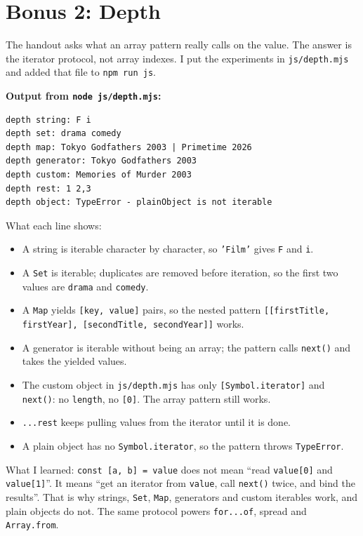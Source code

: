\documentclass[
  11pt,
]{article}
\providecommand{\tightlist}{%
  \setlength{\itemsep}{0pt}\setlength{\parskip}{0pt}}
\begin{document}
\section{Bonus 2: Depth}\label{bonus-2-depth}

The handout asks what an array pattern really calls on the value. The
answer is the iterator protocol, not array indexes. I put the
experiments in \texttt{js/depth.mjs} and added that
file to \texttt{npm run js}.

\textbf{Output from \texttt{node js/depth.mjs}:}

\begin{lstlisting}
depth string: F i
depth set: drama comedy
depth map: Tokyo Godfathers 2003 | Primetime 2026
depth generator: Tokyo Godfathers 2003
depth custom: Memories of Murder 2003
depth rest: 1 2,3
depth object: TypeError - plainObject is not iterable
\end{lstlisting}

What each line shows:

\begin{itemize}
\tightlist
\item
  A string is iterable character by character, so
  \texttt{'Film'} gives \texttt{F} and
  \texttt{i}.
\item
  A \texttt{Set} is iterable; duplicates are removed
  before iteration, so the first two values are
  \texttt{drama} and \texttt{comedy}.
\item
  A \texttt{Map} yields
  \texttt{[key, value]} pairs, so the nested pattern
  \texttt{[[firstTitle, firstYear], [secondTitle, secondYear]]}
  works.
\item
  A generator is iterable without being an array; the pattern calls
  \texttt{next()} and takes the yielded values.
\item
  The custom object in \texttt{js/depth.mjs} has only
  \texttt{[Symbol.iterator]} and
  \texttt{next()}: no \texttt{length},
  no \texttt{[0]}. The array pattern still works.
\item
  \texttt{...rest} keeps pulling values from the
  iterator until it is done.
\item
  A plain object has no \texttt{Symbol.iterator}, so
  the pattern throws \texttt{TypeError}.
\end{itemize}

What I learned: \texttt{const [a, b] = value} does not
mean ``read \texttt{value[0]} and
\texttt{value[1]}''. It means ``get an iterator from
\texttt{value}, call \texttt{next()}
twice, and bind the results''. That is why strings,
\texttt{Set}, \texttt{Map}, generators
and custom iterables work, and plain objects do not. The same protocol
powers \texttt{for...of}, spread and
\texttt{Array.from}.
\end{document}
